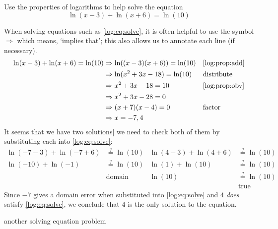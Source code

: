 \begin{pccexample}
	Use the properties of logarithms to help solve the equation
	\begin{equation}\label{log:eq:solve}
		\ln(x-3)+\ln(x+6)=\ln(10)
	\end{equation}
	\begin{pccsolution}
		When solving equations such as \cref{log:eq:solve}, it is often helpful to use the 
		symbol $\Rightarrow$ which means, `implies that'; this also allows
		us to annotate each line (if necessary).
		\begin{align*}
			\ln(x-3)+\ln(x+6)=\ln(10)
			  & \Rightarrow \ln( (x-3)(x+6))=\ln(10) &   & \text{\cref{log:prop:add}} \\
			  & \Rightarrow \ln( x^2+3x-18)=\ln(10)  &   & \text{distribute}          \\
			  & \Rightarrow x^2+3x-18=10             &   & \text{\cref{log:prop:obv}} \\
			  & \Rightarrow x^2+3x-28=0              &   &                            \\
			  & \Rightarrow (x+7)(x-4)=0             &   & \text{factor}              \\
			  & \Rightarrow x=-7,4                   &   &                            
		\end{align*}
		It seems that we have two solutions| we need to check both of them by 
		substituting each into \cref{log:eq:solve}:
		\begin{align*}
			\ln(-7-3)+\ln(-7+6) & \stackrel{?}{=} \ln(10) & \ln(4-3)+\ln(4+6) & \stackrel{?}{=}\ln(10) \\
			\ln(-10)+\ln(-1)    & \stackrel{?}{=}\ln(10)  & \ln(1)+\ln(10)    & \stackrel{?}{=}\ln(10) \\
			                    & \text{domain error!}    & \ln(10)           & \stackrel{?}{=}\ln(10) \\
			                    &                         &                   & \text{true}            
		\end{align*}
		Since $-7$ gives a domain error when substituted into \cref{log:eq:solve} and $4$ \emph{does} satisfy \cref{log:eq:solve}, we conclude
		that $4$ is the only solution to the equation.
	\end{pccsolution}
\end{pccexample}

\begin{pccexample}
	another solving equation problem 
\end{pccexample}

